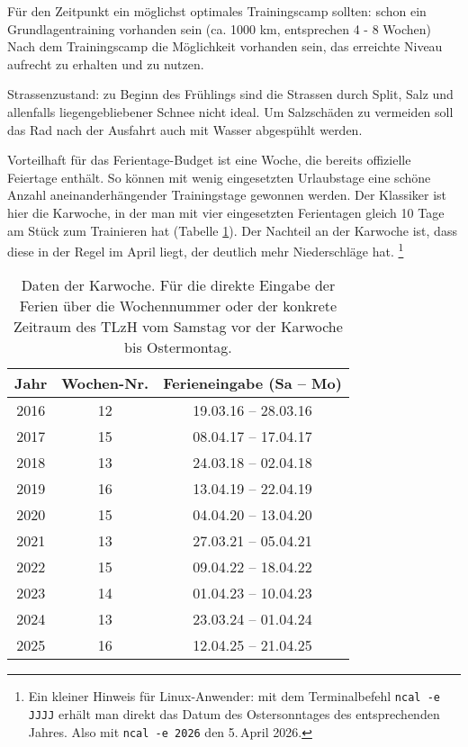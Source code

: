 \documentclass[a4paper,DIV13,BCOR0cm]{scrartcl}
\newcommand{\tlzh}{TLzH}
\begin{document}
Für den Zeitpunkt ein möglichst optimales Trainingscamp sollten:
schon ein Grundlagentraining vorhanden sein (ca. 1000 km, entsprechen 4 - 8 Wochen)
Nach dem Trainingscamp die Möglichkeit vorhanden sein, das erreichte Niveau aufrecht zu erhalten und zu nutzen.

Strassenzustand:
zu Beginn des Frühlings sind die Strassen durch Split, Salz und allenfalls liegengebliebener Schnee nicht ideal.
Um Salzschäden zu vermeiden soll das Rad nach der Ausfahrt auch mit Wasser abgespühlt werden.

Vorteilhaft für das Ferientage-Budget ist eine Woche,
die bereits offizielle Feiertage enthält.
So können mit wenig eingesetzten Urlaubstage eine schöne Anzahl
aneinanderhängender Trainingstage gewonnen werden.
Der Klassiker ist hier die Karwoche,
in der man mit vier eingesetzten Ferientagen gleich 10 Tage am Stück zum Trainieren hat
(Tabelle \ref{tab:karwoche}).
Der Nachteil an der Karwoche ist, dass diese in der Regel im April liegt,
der deutlich mehr Niederschläge hat.
\footnote{Ein kleiner Hinweis für Linux-Anwender:
mit dem Terminalbefehl \texttt{ncal -e JJJJ} erhält man direkt das
Datum des Ostersonntages des entsprechenden Jahres. Also mit \texttt{ncal -e 2026}
den 5.\,April 2026.}

\begin{table}
        \centering
        \begin{tabular}{ccc}
                \toprule
                    Jahr & Wochen-Nr. & Ferieneingabe (Sa -- Mo)\\
                \midrule
                    2016 & 12 & 19.03.16 -- 28.03.16 \\
                    2017 & 15 & 08.04.17 -- 17.04.17 \\
                    2018 & 13 & 24.03.18 -- 02.04.18 \\
                    2019 & 16 & 13.04.19 -- 22.04.19 \\
                    2020 & 15 & 04.04.20 -- 13.04.20 \\
                    2021 & 13 & 27.03.21 -- 05.04.21 \\
                    2022 & 15 & 09.04.22 -- 18.04.22 \\
                    2023 & 14 & 01.04.23 -- 10.04.23 \\
                    2024 & 13 & 23.03.24 -- 01.04.24 \\
                    2025 & 16 & 12.04.25 -- 21.04.25 \\
                \bottomrule
        \end{tabular}
        \caption{Daten der Karwoche.
            Für die direkte Eingabe der Ferien über die Wochennummer oder
            der konkrete Zeitraum des \tlzh{} vom Samstag vor der Karwoche bis Ostermontag.}
        \label{tab:karwoche}
\end{table}
\end{document}
